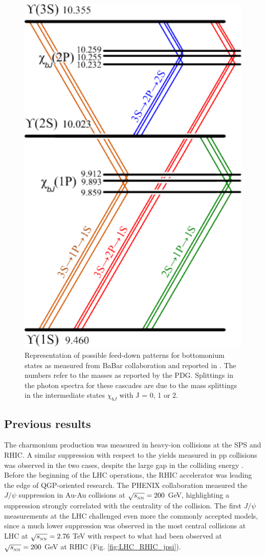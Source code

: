 \begin{figure}[!t]
\begin{center}
\includegraphics[width=0.45\linewidth]{Chapters/Analysis/Figs/BottomoniumSpectro.pdf}
\caption{Representation of possible feed-down patterns for bottomonium states as measured from BaBar collaboration and reported in \cite{Lees:2014qea}. The numbers refer to the masses as reported by the PDG. Splittings in the photon spectra for these cascades are due to the mass splittings in the intermediate states $\chi_{bJ}$ with J = 0, 1 or 2.}
\label{fig:BBSpectro}
\end{center}
\end{figure}

\subsection{Previous results}

The charmonium production was measured in heavy-ion collisions at the SPS and RHIC. 
A similar suppression with respect to the yields measured in pp collisions was observed in the two cases, despite the large gap in the colliding energy \cite{Rapp:2017chc}.
Before the beginning of the LHC operations, the RHIC accelerator was leading the edge of QGP-oriented research.
The PHENIX collaboration measured the $J/\psi$ suppression in Au-Au collisions at $\sqrt{s_{_{\rm NN}}}=200$ GeV, highlighting a suppression strongly correlated with the centrality of the collision.
The first $J/\psi$ measurements at the LHC challenged even more the commonly accepted models, since a much lower suppression was observed in the most central collisions at LHC at $\sqrt{s_{_{\rm NN}}}=2.76$ TeV with respect to what had been observed at $\sqrt{s_{_{\rm NN}}}=200$ GeV at RHIC (Fig. \ref{fig:LHC_RHIC_jpsi}).

